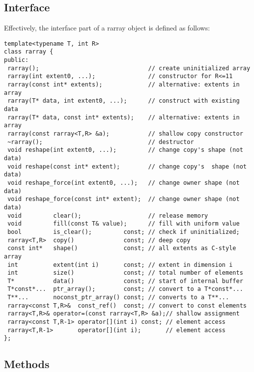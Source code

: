 \documentclass[11pt,twoside]{article}
\begin{document}
\subsection{Interface}
Effectively, the interface part of a rarray object is defined as follows:%
\vspace{-8pt}%
\begin{framed}\vspace{-14pt}%
\begin{verbatim}
template<typename T, int R>
class rarray {
public:    
 rarray();                               // create uninitialized array
 rarray(int extent0, ...);               // constructor for R<=11
 rarray(const int* extents);             // alternative: extents in array
 rarray(T* data, int extent0, ...);      // construct with existing data
 rarray(T* data, const int* extents);    // alternative: extents in array
 rarray(const rarray<T,R> &a);           // shallow copy constructor   
 ~rarray();                              // destructor 
 void reshape(int extent0, ...);         // change copy's shape (not data)
 void reshape(const int* extent);        // change copy's  shape (not data)
 void reshape_force(int extent0, ...);   // change owner shape (not data)
 void reshape_force(const int* extent);  // change owner shape (not data)
 void         clear();                   // release memory
 void         fill(const T& value);      // fill with uniform value
 bool         is_clear();         const; // check if uninitialized;
 rarray<T,R>  copy()              const; // deep copy
 const int*   shape()             const; // all extents as C-style array
 int          extent(int i)       const; // extent in dimension i
 int          size()              const; // total number of elements
 T*           data()              const; // start of internal buffer
 T*const*...  ptr_array();        const; // convert to a T*const*... 
 T**...       noconst_ptr_array() const; // converts to a T**... 
 rarray<const T,R>&  const_ref()  const; // convert to const elements
 rarray<T,R>& operator=(const rarray<T,R> &a);// shallow assignment
 rarray<const T,R-1> operator[](int i) const; // element access
 rarray<T,R-1>       operator[](int i);       // element access
};
\end{verbatim}
\end{framed}



\subsection{Methods}
\end{document}
